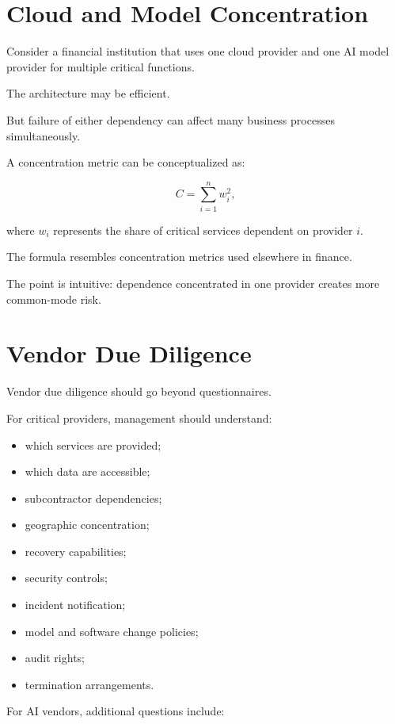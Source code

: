 \section{Cloud and Model Concentration}

Consider a financial institution that uses one cloud provider and one AI model provider for multiple critical functions.

The architecture may be efficient.

But failure of either dependency can affect many business processes simultaneously.

A concentration metric can be conceptualized as:

\begin{equation}
C =
\sum_{i=1}^{n} w_i^2,
\end{equation}

where \(w_i\) represents the share of critical services dependent on provider \(i\).

The formula resembles concentration metrics used elsewhere in finance.

The point is intuitive: dependence concentrated in one provider creates more common-mode risk.

\section{Vendor Due Diligence}

Vendor due diligence should go beyond questionnaires.

For critical providers, management should understand:

\begin{itemize}
    \item which services are provided;
    \item which data are accessible;
    \item subcontractor dependencies;
    \item geographic concentration;
    \item recovery capabilities;
    \item security controls;
    \item incident notification;
    \item model and software change policies;
    \item audit rights;
    \item termination arrangements.
\end{itemize}

For AI vendors, additional questions include:

